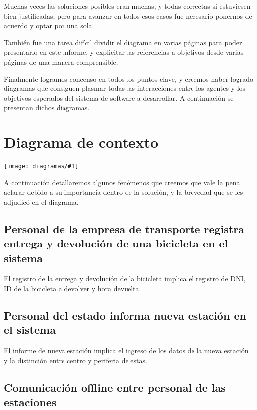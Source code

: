 \documentclass[a4paper, 10pt, twoside]{article}
\newcommand{\diagramah}[1]{
  \texttt{[image: diagramas/\#1]}
}
\begin{document}
Muchas veces las soluciones posibles eran muchas, y todas correctas si estuviesen bien justificadas, pero para avanzar en todos esos casos fue necesario ponernos de acuerdo y optar por una sola.

También fue una tarea difícil dividir el diagrama en varias páginas para poder presentarlo en este informe, y explicitar las referencias a objetivos desde varias páginas de una manera comprensible.

Finalmente logramos concenso en todos los puntos clave, y creemos haber logrado diagramas que consiguen plasmar todas las interacciones entre los agentes y los objetivos esperados del sistema de software a desarrollar. A continuación se presentan dichos diagramas.




\section{Diagrama de contexto}

\diagramah{contexto}

A continuación detallaremos algunos fenómenos que creemos que vale la pena aclarar debido a su importancia dentro de la solución, y la brevedad que se les adjudicó en el diagrama.

\subsection{Personal de la empresa de transporte registra entrega y devolución de una bicicleta en el sistema}

El registro de la entrega y devolución de la bicicleta implica el registro de DNI, ID de la bicicleta a devolver y hora devuelta.

\subsection{Personal del estado informa nueva estación en el sistema}

El informe de nueva estación implica el ingreso de los datos de la nueva estación y la distinción entre centro y periferia de estas.

\subsection{Comunicación offline entre personal de las estaciones}
\end{document}

